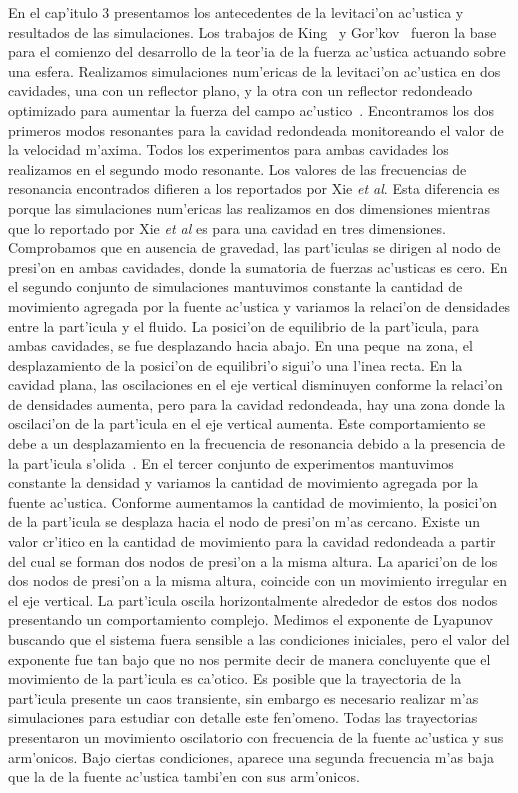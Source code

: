 En el cap'itulo 3 presentamos los antecedentes de la levitaci'on ac'ustica y resultados
de las simulaciones.
Los trabajos de King~\cite{king34} y Gor'kov~\cite{gorkov62} fueron la base 
para el comienzo del desarrollo de la teor'ia de la fuerza ac'ustica actuando
sobre una esfera. Realizamos simulaciones num'ericas de la levitaci'on 
ac'ustica en dos cavidades, una con un reflector plano, y la otra con un reflector
redondeado optimizado para aumentar la fuerza del campo ac'ustico~\cite{xie01}.
Encontramos los dos primeros modos resonantes para la cavidad redondeada monitoreando
el valor de la velocidad m'axima. Todos los experimentos para ambas
cavidades los realizamos en el segundo modo resonante. Los valores de las frecuencias de resonancia 
encontrados difieren a los reportados por
Xie {\it et al}. Esta diferencia es porque las simulaciones num'ericas las realizamos
en dos dimensiones mientras que lo reportado por Xie {\it et al} es para una cavidad
en tres dimensiones. Comprobamos
que en ausencia de gravedad, las part'iculas se dirigen al nodo de presi'on en ambas
cavidades, donde la
sumatoria de fuerzas ac'usticas es cero. En el segundo conjunto de simulaciones
mantuvimos constante la cantidad de movimiento agregada por la fuente ac'ustica
y variamos la  relaci'on de densidades entre la part'icula y el fluido. 
La posici'on de equilibrio de la part'icula, para ambas cavidades,
se fue desplazando hacia abajo. En una peque~na zona, el desplazamiento de la 
posici'on de equilibri'o sigui'o una l'inea recta. En la cavidad plana, las oscilaciones en el eje vertical
disminuyen conforme la relaci'on de densidades aumenta, pero para la cavidad 
redondeada, hay una zona donde la oscilaci'on de la part'icula en el eje vertical aumenta.
Este comportamiento se debe a un desplazamiento en la frecuencia de resonancia debido
a la presencia de la part'icula s'olida~\cite{leung82}. En el tercer conjunto
de experimentos mantuvimos constante la densidad y variamos la cantidad de movimiento
agregada por la fuente ac'ustica. Conforme aumentamos la cantidad de movimiento, la
posici'on de la part'icula se desplaza hacia el nodo de presi'on m'as cercano. 
Existe un valor cr'itico en la cantidad de movimiento para la cavidad redondeada  a
partir del cual se forman dos nodos de presi'on a la misma altura. La aparici'on de los dos
nodos de presi'on a la misma altura, coincide con un movimiento irregular en el eje
vertical. La part'icula
oscila horizontalmente alrededor de estos dos nodos presentando un comportamiento 
complejo. Medimos el exponente de Lyapunov buscando que el sistema fuera sensible
a las condiciones iniciales, pero el valor del exponente fue tan bajo que no nos permite
decir de manera concluyente que el movimiento de la part'icula es ca'otico. Es posible
que la trayectoria de la part'icula presente un caos transiente, sin embargo es necesario
realizar m'as simulaciones para estudiar con detalle este fen'omeno.
Todas las trayectorias 
presentaron un movimiento oscilatorio con frecuencia de la fuente ac'ustica y sus arm'onicos.
Bajo ciertas condiciones, aparece una segunda frecuencia m'as baja que la de la fuente
ac'ustica tambi'en con sus arm'onicos.


